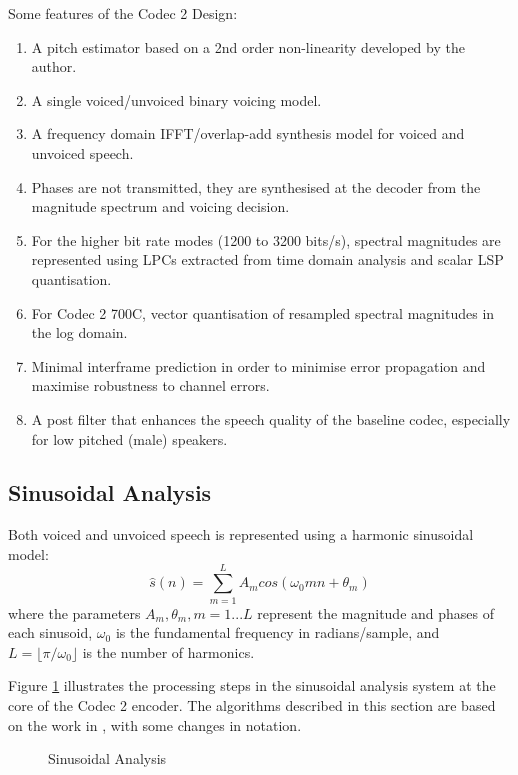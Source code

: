 \documentclass{article}
\begin{document}
{Some features of the Codec 2 Design:
\begin{enumerate}
\item A pitch estimator based on a 2nd order non-linearity developed by the author.
\item A single voiced/unvoiced binary voicing model.
\item A frequency domain IFFT/overlap-add synthesis model for voiced and unvoiced speech.
\item Phases are not transmitted, they are synthesised at the decoder from the magnitude spectrum and voicing decision.  
\item For the higher bit rate modes (1200 to 3200 bits/s), spectral magnitudes are represented using LPCs extracted from time domain analysis and scalar LSP quantisation.
\item For Codec 2 700C, vector quantisation of resampled spectral magnitudes in the log domain.
\item Minimal interframe prediction in order to minimise error propagation and maximise robustness to channel errors.
\item A post filter that enhances the speech quality of the baseline codec, especially for low pitched (male) speakers.
\end{enumerate}

\subsection{Sinusoidal Analysis}

Both voiced and unvoiced speech is represented using a harmonic sinusoidal model:
\begin{equation}
\hat{s}(n) = \sum_{m=1}^L A_m cos(\omega_0 m n + \theta_m)
\end{equation}
where the parameters $A_m, \theta_m, m=1...L$ represent the magnitude and phases of each sinusoid, $\omega_0$ is the fundamental frequency in radians/sample, and $L=\lfloor \pi/\omega_0 \rfloor$ is the number of harmonics.

Figure \ref{fig:analysis} illustrates the processing steps in the sinusoidal analysis system at the core of the Codec 2 encoder.  The algorithms described in this section are based on the work in \cite{rowe1997techniques}, with some changes in notation.

\begin{figure}[h]
\caption{Sinusoidal Analysis}
\label{fig:analysis}
\begin{center}
\begin{tikzpicture}[auto, node distance=2cm,>=triangle 45,x=1.0cm,y=1.0cm, align=center]


\end{tikzpicture}
\end{center}
\end{figure}}
\end{document}
